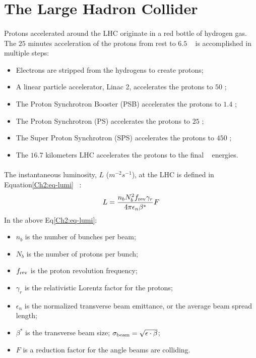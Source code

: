 \section{The Large Hadron Collider}
\label{sec:LHC}
\paragraph{}
Protons accelerated around the LHC originate in a red bottle of hydrogen gas. 
The $25$ minutes acceleration of the protons from rest to $6.5$ \TeV~ is accomplished in multiple steps:
\begin{itemize}
\item Electrons are stripped from the hydrogens to create protons;
\item A linear particle accelerator, Linac 2, accelerates the protons to $50$ \MeV; 
\item The Proton Synchrotron Booster (PSB) accelerates the protons to $1.4$ \GeV;
\item The Proton Synchrotron (PS) accelerates the protons to $25$ \GeV; 
\item The Super Proton Synchrotron (SPS) accelerates the protons to $450$ \GeV;
\item The $16.7$ kilometers LHC accelerates the protons to the final \TeV~ energies. 
\end{itemize}

\paragraph{}
The instantaneous luminosity, $L$ ($m^{-2}s^{-1}$), at the LHC is defined in Equation\ref{Ch2:eq-lumi} ~\cite{LHCReview}:
%
\begin{equation}
\label{Ch2:eq-lumi}
L = \frac{n_b N_b^2 f_{\rm rev} \gamma_r}{4\pi \epsilon_n \beta^*} F
\end{equation}
%
In the above Eq\ref{Ch2:eq-lumi}:
\begin{itemize}
	\item $n_b$ is the number of bunches per beam; %
	\item $N_b$ is the number of protons per bunch;  
	\item $f_{\rm rev}$ is the proton revolution frequency;
	\item $\gamma_r$ is the relativistic Lorentz factor for the protons;
	\item $\epsilon_n$ is the normalized transverse beam emittance, or the average beam spread length;
	\item $\beta^*$ is the transverse beam size; $\sigma_{\rm beam} = \sqrt{\epsilon \cdot \beta}$; %
	\item $F$ is a reduction factor for the angle beams are colliding. %
\end{itemize}

